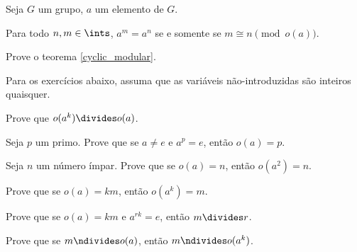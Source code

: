 Seja $G$ um grupo, $a$ um elemento de $G$.
\begin{definition}[Teorema]
	\label{cyclic_modular}
	Para todo $n, m \in \ints$, $a^m = a^n$ se e somente se $m \cong n \pmod {o(a)}$.
\end{definition}

\begin{exercise}
	Prove o teorema \ref{cyclic_modular}.
\end{exercise}

Para os exercícios abaixo, assuma que as variáveis não-introduzidas são inteiros quaisquer.

\begin{exercise}
	Prove que $o(a^k) \divides o(a)$.
\end{exercise}

\begin{exercise}
	Seja $p$ um primo.
	Prove que se $a \not = e$ e $a^p = e$, então $o(a) = p$. 
\end{exercise}

\begin{exercise}
	Seja $n$ um número ímpar. 
	Prove que se $o(a) = n$, então $o(a^2) = n$.
\end{exercise}

\begin{exercise}
	Prove que se $o(a) = km$, então $o(a^k) = m$.
\end{exercise}

\begin{exercise}
	Prove que se $o(a) = km$ e $a^{rk} = e$, então $m \divides r$.
\end{exercise}

\begin{exercise}
	Prove que se $m \ndivides o(a)$, então $m \ndivides o(a^k)$.
\end{exercise}

